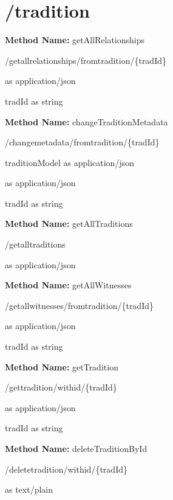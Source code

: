 \section{/tradition}
\textbf{Method Name: }getAllRelationships
\begin{get}
/getallrelationships/fromtradition/\{tradId\}
\end{get}
\begin{response}
 as application/json
\end{response}
\begin{parameter}
tradId as string
\end{parameter}
\textbf{Method Name: }changeTraditionMetadata
\begin{post}
/changemetadata/fromtradition/\{tradId\}
\end{post}
\begin{request}
traditionModel as application/json
\end{request}
\begin{response}
 as application/json
\end{response}
\begin{parameter}
tradId as string
\end{parameter}
\textbf{Method Name: }getAllTraditions
\begin{get}
/getalltraditions
\end{get}
\begin{response}
 as application/json
\end{response}
\textbf{Method Name: }getAllWitnesses
\begin{get}
/getallwitnesses/fromtradition/\{tradId\}
\end{get}
\begin{response}
 as application/json
\end{response}
\begin{parameter}
tradId as string
\end{parameter}
\textbf{Method Name: }getTradition
\begin{get}
/gettradition/withid/\{tradId\}
\end{get}
\begin{response}
 as application/json
\end{response}
\begin{parameter}
tradId as string
\end{parameter}
\textbf{Method Name: }deleteTraditionById
\begin{delete}
/deletetradition/withid/\{tradId\}
\end{delete}
\begin{response}
 as text/plain
\end{response}
